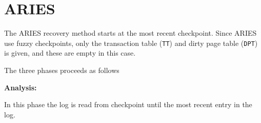 
\section{ARIES}

The ARIES recovery method starts at the most recent checkpoint. Since ARIES
use fuzzy checkpoints, only the transaction table ({\tt TT}) and dirty page
table ({\tt DPT}) is given, and these are empty in this case.

\noindent
The three phases proceeds as follows

\noindent
{\bf Analysis:}

In this phase the log is read from checkpoint until the most recent entry in
the log.

